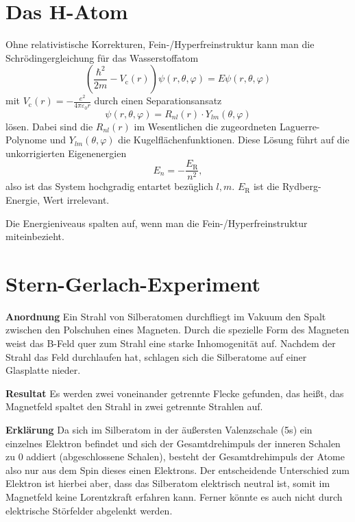 \section{Das H-Atom}
Ohne relativistische Korrekturen, Fein-/Hyperfreinstruktur kann man die Schrödingergleichung für das Wasserstoffatom
\begin{equation*}
	\left(\frac{\hbar^2}{2m}-V_\text{c}(r)\right)\psi(r,\theta,\varphi) = E\psi(r,\theta,\varphi)
\end{equation*}
mit $V_\text{c}(r)=-\frac{e^2}{4\pi\varepsilon_0r}$ durch einen Separationsansatz
\begin{equation*}
	\psi(r,\theta,\varphi) = R_{nl}(r)\cdot Y_{lm}(\theta,\varphi)
\end{equation*}
lösen.
Dabei sind die $R_{nl}(r)$ im Wesentlichen die zugeordneten Laguerre-Polynome und $Y_{lm}(\theta,\varphi)$ die Kugelflächenfunktionen.
Diese Lösung führt auf die unkorrigierten Eigenenergien
\begin{equation*}
	E_n = -\frac{E_\text{R}}{n^2},
\end{equation*}
also ist das System hochgradig entartet bezüglich $l,m$.
$E_\text{R}$ ist die Rydberg-Energie, Wert irrelevant.

Die Energieniveaus spalten auf, wenn man die Fein-/Hyperfreinstruktur miteinbezieht.

\section{Stern-Gerlach-Experiment}
\textbf{Anordnung}  Ein Strahl von Silberatomen durchfliegt im Vakuum den Spalt zwischen den Polschuhen eines Magneten.
Durch die spezielle Form des Magneten weist das B-Feld quer zum Strahl eine starke Inhomogenität auf.
Nachdem der Strahl das Feld durchlaufen hat, schlagen sich die Silberatome auf einer Glasplatte nieder.

\textbf{Resultat}  Es werden zwei voneinander getrennte Flecke gefunden, das heißt, das Magnetfeld spaltet den Strahl in zwei getrennte Strahlen auf.

\textbf{Erklärung}  Da sich im Silberatom in der äußersten Valenzschale (5s) ein einzelnes Elektron befindet und sich der Gesamtdrehimpuls der inneren Schalen zu 0 addiert (abgeschlossene Schalen), besteht der Gesamtdrehimpuls der Atome also nur aus dem Spin dieses einen Elektrons.
Der entscheidende Unterschied zum Elektron ist hierbei aber, dass das Silberatom elektrisch neutral ist, somit im Magnetfeld keine Lorentzkraft erfahren kann.
Ferner könnte es auch nicht durch elektrische Störfelder abgelenkt werden.

